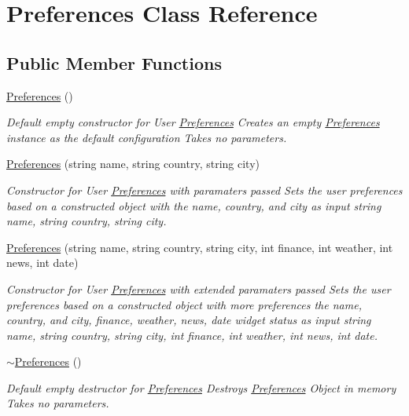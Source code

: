 \hypertarget{class_preferences}{}\section{Preferences Class Reference}
\label{class_preferences}
\subsection*{Public Member Functions}
\begin{DoxyCompactItemize}
\item 
\mbox{\hyperlink{class_preferences_a9ca3b7029509bc36da1a57ed296c2fa8}{Preferences}} ()
\begin{DoxyCompactList}\small\item\em Default empty constructor for User \mbox{\hyperlink{class_preferences}{Preferences}}  Creates an empty \mbox{\hyperlink{class_preferences}{Preferences}} instance as the default configuration  Takes no parameters. \end{DoxyCompactList}\item 
\mbox{\hyperlink{class_preferences_a419ad1e25778f1705cd8c15cd18fcdab}{Preferences}} (string name, string country, string city)
\begin{DoxyCompactList}\small\item\em Constructor for User \mbox{\hyperlink{class_preferences}{Preferences}} with paramaters passed  Sets the user preferences based on a constructed object with the name, country, and city as input  string name, string country, string city. \end{DoxyCompactList}\item 
\mbox{\hyperlink{class_preferences_af8b8a891846a7c555e3c7861bc2c1841}{Preferences}} (string name, string country, string city, int finance, int weather, int news, int date)
\begin{DoxyCompactList}\small\item\em Constructor for User \mbox{\hyperlink{class_preferences}{Preferences}} with extended paramaters passed  Sets the user preferences based on a constructed object with more preferences the name, country, and city, finance, weather, news, date widget status as input  string name, string country, string city, int finance, int weather, int news, int date. \end{DoxyCompactList}\item 
\mbox{\hyperlink{class_preferences_a20020f4fceeefb048a5eeddec6c28376}{$\sim$\+Preferences}} ()
\begin{DoxyCompactList}\small\item\em Default empty destructor for \mbox{\hyperlink{class_preferences}{Preferences}}  Destroys \mbox{\hyperlink{class_preferences}{Preferences}} Object in memory  Takes no parameters. \end{DoxyCompactList}\item 

\end{DoxyCompactItemize}
